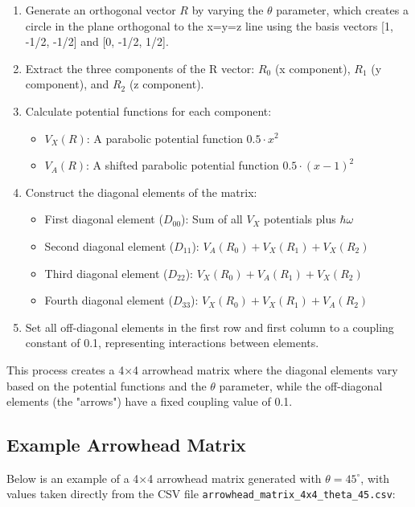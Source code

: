 \begin{enumerate}
    \item Generate an orthogonal vector $R$ by varying the $\theta$ parameter, which creates a circle in the plane orthogonal to the x=y=z line using the basis vectors [1, -1/2, -1/2] and [0, -1/2, 1/2].
    \item Extract the three components of the R vector: $R_0$ (x component), $R_1$ (y component), and $R_2$ (z component).
    \item Calculate potential functions for each component:
    \begin{itemize}
        \item $V_X(R)$: A parabolic potential function $0.5 \cdot x^2$
        \item $V_A(R)$: A shifted parabolic potential function $0.5 \cdot (x-1)^2$
    \end{itemize}
    \item Construct the diagonal elements of the matrix:
    \begin{itemize}
        \item First diagonal element ($D_{00}$): Sum of all $V_X$ potentials plus $\hbar\omega$
        \item Second diagonal element ($D_{11}$): $V_A(R_0) + V_X(R_1) + V_X(R_2)$
        \item Third diagonal element ($D_{22}$): $V_X(R_0) + V_A(R_1) + V_X(R_2)$
        \item Fourth diagonal element ($D_{33}$): $V_X(R_0) + V_X(R_1) + V_A(R_2)$
    \end{itemize}
    \item Set all off-diagonal elements in the first row and first column to a coupling constant of 0.1, representing interactions between elements.
\end{enumerate}

This process creates a 4×4 arrowhead matrix where the diagonal elements vary based on the potential functions and the $\theta$ parameter, while the off-diagonal elements (the "arrows") have a fixed coupling value of 0.1.

\subsection{Example Arrowhead Matrix}

Below is an example of a 4×4 arrowhead matrix generated with $\theta = 45^{\circ}$, with values taken directly from the CSV file \texttt{arrowhead\_matrix\_4x4\_theta\_45.csv}:

